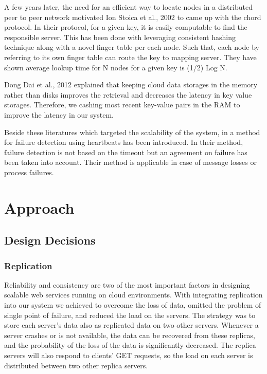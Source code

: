\documentclass{sig-alternate}
\begin{document}
A few years later, the need for an efficient way to locate nodes in a distributed peer to peer network motivated Ion Stoica et al., 2002 \cite{chord} to came up with the chord protocol. In their protocol, for a given key,   it is easily computable to find the responsible server. This has been done with leveraging consistent hashing technique along with a novel finger table per each node. Such that, each node by referring to its own finger table can route the key to mapping server. They have shown average lookup time for N nodes for a given key is (1/2) Log N. 

Dong Dai et al., 2012 \cite{memory} explained that keeping cloud data storages in the memory rather than disks improves the retrieval and decreases the latency in key value storages. Therefore, we cashing most recent key-value pairs in the RAM to improve the latency in our system.

Beside these literatures which targeted the scalability of the system, in \cite{heartbeat} a method for failure detection using heartbeats has been introduced. In their method, failure detection is not based on the timeout  but an agreement on failure has been taken into account. Their method is applicable in case of message losses or process failures.


\section{Approach}
\subsection{Design Decisions}
\subsubsection{Replication}
Reliability and consistency are two of the most important factors in designing scalable web services running on cloud environments. With integrating replication into our system we achieved to overcome the loss of data, omitted the problem of single point of failure, and reduced the load on the servers. The strategy was to store each server's data also as replicated data on two other servers. Whenever a server crashes or is not available, the data can be recovered from these replicas, and the probability of the loss of the data is  significantly decreased. The replica servers will also respond to clients' GET requests, so the load on each server is distributed between two other replica servers. 
\end{document}
